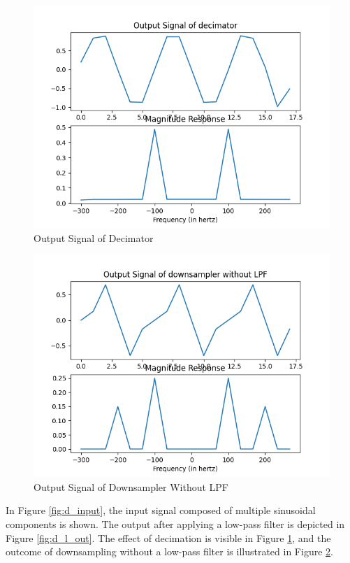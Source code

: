 \documentclass{article}
\begin{document}
\begin{figure}[ht]
  \centering
  \includegraphics[scale=0.5]{./dsp/figs/output_decimator.png}
  \caption{ Output Signal of Decimator}
  \label{fig:output_decimator}
\end{figure}
\begin{figure}[ht]
  \centering
  \includegraphics[scale=0.5]{./dsp/figs/output_downsampler.png}
  \caption{Output Signal of Downsampler Without LPF}
  \label{fig:output_downsampler}
\end{figure}
In Figure \ref{fig:d_input}, the input signal composed of multiple sinusoidal components is shown. The output after applying a low-pass filter is depicted in Figure \ref{fig:d_l_out}. The effect of decimation is visible in Figure \ref{fig:output_decimator}, and the outcome of downsampling without a low-pass filter is illustrated in Figure \ref{fig:output_downsampler}.
\end{document}
